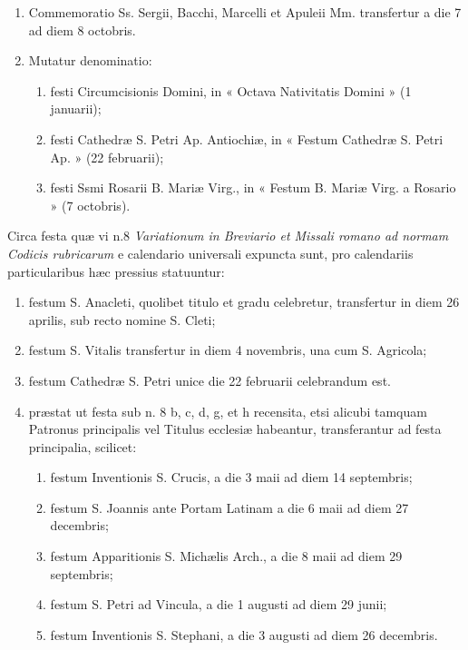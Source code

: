 \documentclass[vesperale_romanum.tex]{subfiles}
\begin{document}
\begin{enumerate}
\item Commemoratio Ss. Sergii, Bacchi, Marcelli et Apuleii Mm. transfertur a die 7 ad diem 8 octobris.

\item Mutatur denominatio:
\begin{enumerate}[nosep,label=\alph*.]
\item festi Circumcisionis Domini, in « Octava Nativitatis Domini »
(1 januarii);
\item festi Cathedræ S. Petri Ap. Antiochiæ, in « Festum Cathedræ S. Petri Ap. » (22 februarii);
\item festi Ssmi Rosarii B. Mariæ Virg., in « Festum B. Mariæ Virg.
a Rosario » (7 octobris).
\end{enumerate}\end{enumerate}

Circa festa quæ vi n.\@ 8 \textit{Variationum in Breviario et Missali romano ad normam Codicis rubricarum} e calendario universali expuncta sunt, pro calendariis particularibus hæc pressius statuuntur:
\begin{enumerate}[nosep,label=\alph*.]
\item  festum S. Anacleti, quolibet titulo et gradu celebretur, transfertur in diem 26 aprilis, sub recto nomine S. Cleti;
\item festum S. Vitalis transfertur in diem 4 novembris, una cum S. Agricola;
\item festum Cathedræ S. Petri unice die 22 februarii celebrandum est.
\item præstat ut festa sub n. 8 b, c, d, g, et h recensita, etsi alicubi tamquam Patronus principalis vel Titulus ecclesiæ habeantur, transferantur ad festa principalia, scilicet:
\begin{enumerate}[nosep,label=\arabic*.]
\item festum Inventionis S. Crucis, a die 3 maii ad diem 14 septembris;
\item festum S. Joannis ante Portam Latinam a die 6 maii ad diem 27 decembris;
\item festum Apparitionis S. Michælis Arch., a die 8 maii ad diem 29 septembris;
\item festum S. Petri ad Vincula, a die 1 augusti ad diem 29 junii;
\item festum Inventionis S. Stephani, a die 3 augusti ad diem 26 decembris.
\end{enumerate}
\end{enumerate}
\end{document}
